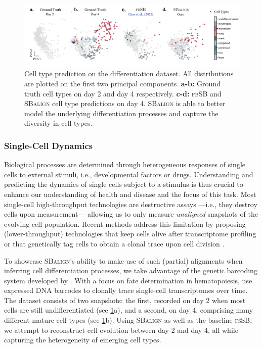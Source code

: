 \begin{figure}[t]
    \centering
    \includegraphics[width=\textwidth]{figures/fig_cell_pred_types.pdf}
    \caption{Cell type prediction on the differentiation dataset. All distributions are plotted on the first two principal components. \textbf{a-b:} Ground truth cell types on day 2 and day 4 respectively. \textbf{c-d:} \textsc{fbSB} and \textsc{SBalign} cell type predictions on day 4. \textsc{SBalign} is able to better model the underlying differentiation processes and capture the diversity in cell types.}
    \label{fig:results_cell_class}
\end{figure}

\subsubsection{Single-Cell Dynamics}
\label{sec:sbalign_cell}

 Biological processes are determined through heterogeneous responses of single cells to external stimuli, i.e., developmental factors or drugs. Understanding and predicting the dynamics of single cells subject to a stimulus is thus crucial to enhance our understanding of health and disease and the focus of this task.
Most single-cell high-throughput technologies are destructive assays ---i.e., they destroy cells upon measurement--- allowing us to only measure \textit{unaligned} snapshots of the evolving cell population. Recent methods address this limitation by proposing (lower-throughput) technologies that keep cells alive after transcriptome profiling \citep{chen2022live} or that genetically tag cells to obtain a clonal trace upon cell division \citep{weinreb2020lineage}.

To showcase \textsc{SBalign}'s ability to make use of such (partial) alignments when inferring cell differentiation processes, we take advantage of the genetic barcoding system developed by \citet{weinreb2020lineage}. With a focus on fate determination in hematopoiesis, \citet{weinreb2020lineage} use expressed DNA barcodes to clonally trace single-cell transcriptomes over time. The dataset consists of two snapshots: the first, recorded on day 2 when most cells are still undifferentiated (see \cref{fig:results_cell_class}a), and a second, on day 4, comprising many different mature cell types (see \cref{fig:results_cell_class}b). Using \textsc{SBalign} as well as the baseline \textsc{fsSB}, we attempt to reconstruct cell evolution between day 2 and day 4, all while capturing the heterogeneity of emerging cell types.

